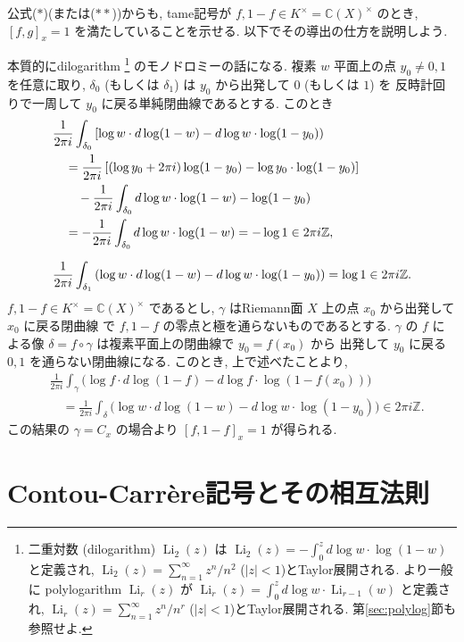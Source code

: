 \documentclass[12pt,twoside]{jarticle}
\newcommand\Z{{\mathbb Z}} %
\newcommand\C{{\mathbb C}} %
\theoremstyle{definition} %
\theoremstyle{definition} %
\theoremstyle{definition} %
\numberwithin{theorem}{section}
\numberwithin{equation}{section}
\numberwithin{figure}{section}
\numberwithin{table}{section}
\newcommand\secref[1]{第\ref{#1}節}
\newcommand\tame[3]{\left[#2,#3\right]_{#1}}
\newcommand\Li{\operatorname{Li}}
\begin{document}
公式($\ast$)(または($\ast\ast$))からも, 
tame記号が $f,1-f\in K^\times=\C(X)^\times$ のとき, 
$\tame{x}{f}{g}=1$ を満たしていることを示せる.
以下でその導出の仕方を説明しよう.

本質的にdilogarithm%
\footnote{
二重対数 (dilogarithm) $\Li_2(z)$ は $\Li_2(z)=-\int_0^z d\log w\cdot\log(1-w)$ 
と定義され, $\Li_2(z)=\sum_{n=1}^\infty z^n/n^2$ ($|z|<1$)とTaylor展開される. 
より一般に polylogarithm $\Li_r(z)$ 
が $\Li_r(z)=\int_0^z d\log w\cdot\Li_{r-1}(w)$ と定義され, 
$\Li_r(z)=\sum_{n=1}^\infty z^n/n^r$ ($|z|<1$)とTaylor展開される.
\secref{sec:polylog}も参照せよ.
}%
のモノドロミーの話になる.
複素 $w$ 平面上の点 $y_0\ne 0,1$ を任意に取り, 
$\delta_0$ (もしくは $\delta_1$) は $y_0$ から出発して $0$ (もしくは $1$) を
反時計回りで一周して $y_0$ に戻る単純閉曲線であるとする.
このとき
\begin{align*}
&
\frac{1}{2\pi i}\int_{\delta_0}
\left[
 \log w\cdot d\log(1-w) - d\log w\cdot\log(1-y_0)
\right)
\\ & \quad
=\frac{1}{2\pi i}\left[
   (\log y_0+2\pi i)\log(1-y_0) - \log y_0\cdot\log(1-y_0)
\right]
\\ & \qquad
-\frac{1}{2\pi i}\int_{\delta_0} d\log w\cdot\log(1-w)
-\log(1-y_0)
\\ & \quad
= -\frac{1}{2\pi i}\int_{\delta_0} d\log w\cdot\log(1-w)
= -\log 1
\in 2\pi i\Z,
\\[\medskipamount]
& 
\frac{1}{2\pi i}\int_{\delta_1}
\left( 
 \log w \cdot d\log(1-w) - d\log w\cdot\log(1-y_0)
\right)
=\log 1\in 2\pi i\Z.
\end{align*}
$f,1-f\in K^\times=\C(X)^\times$ であるとし, 
$\gamma$ はRiemann面 $X$ 上の点 $x_0$ から出発して $x_0$ に戻る閉曲線
で $f,1-f$ の零点と極を通らないものであるとする.
$\gamma$ の $f$ による像 $\delta=f\circ\gamma$ は複素平面上の閉曲線で $y_0=f(x_0)$ から
出発して $y_0$ に戻る $0,1$ を通らない閉曲線になる.
このとき, 上で述べたことより, 
\begin{align*}
&
\frac{1}{2\pi i}\int_\gamma
\bigl( \log f\cdot d\log(1-f) - d\log f\cdot\log(1-f(x_0)) \bigr)
\\ & \quad
=
\frac{1}{2\pi i}\int_\delta
\bigl( \log w\cdot d\log(1-w) - d\log w\cdot\log(1-y_0) \bigr)
\in 2\pi i\Z.
\end{align*}
この結果の $\gamma=C_x$ の場合より $\tame{x}{f}{1-f}=1$ が得られる.


\section{Contou-Carr\`ere記号とその相互法則}
\end{document}
